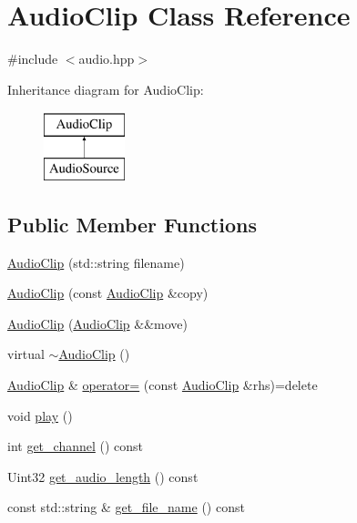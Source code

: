 \hypertarget{class_audio_clip}{}\section{Audio\+Clip Class Reference}
\label{class_audio_clip}


{\ttfamily \#include $<$audio.\+hpp$>$}

Inheritance diagram for Audio\+Clip\+:\begin{figure}[H]
\begin{center}
\leavevmode
\includegraphics[height=2.000000cm]{class_audio_clip}
\end{center}
\end{figure}
\subsection*{Public Member Functions}
\begin{DoxyCompactItemize}
\item 
\mbox{\hyperlink{class_audio_clip_a92cb3dceab020f54290b05b1ae5de974}{Audio\+Clip}} (std\+::string filename)
\item 
\mbox{\hyperlink{class_audio_clip_ac5664fc84d17e5e31c1daacdec89b3cf}{Audio\+Clip}} (const \mbox{\hyperlink{class_audio_clip}{Audio\+Clip}} \&copy)
\item 
\mbox{\hyperlink{class_audio_clip_a0a4d351823548e0f54625c37db221c82}{Audio\+Clip}} (\mbox{\hyperlink{class_audio_clip}{Audio\+Clip}} \&\&move)
\item 
virtual \mbox{\hyperlink{class_audio_clip_ab929796e463c51c50f2ad4e9acec35da}{$\sim$\+Audio\+Clip}} ()
\item 
\mbox{\hyperlink{class_audio_clip}{Audio\+Clip}} \& \mbox{\hyperlink{class_audio_clip_ac1466d6ec65150fa8beb08611cda995c}{operator=}} (const \mbox{\hyperlink{class_audio_clip}{Audio\+Clip}} \&rhs)=delete
\item 
void \mbox{\hyperlink{class_audio_clip_a615c3e8e6da9cdf8b98c1682135c2a75}{play}} ()
\item 
int \mbox{\hyperlink{class_audio_clip_a86486cb3622e9056d4d5f580889f9f16}{get\+\_\+channel}} () const
\item 
Uint32 \mbox{\hyperlink{class_audio_clip_ae4ff05317126ce507a64c836f524ca4f}{get\+\_\+audio\+\_\+length}} () const
\item 
const std\+::string \& \mbox{\hyperlink{class_audio_clip_aadb9a7b1a085647f61f0120953734ca0}{get\+\_\+file\+\_\+name}} () const
\end{DoxyCompactItemize}


